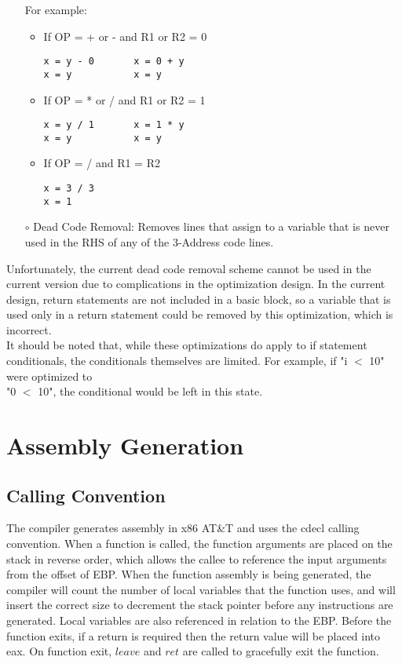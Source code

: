 \documentclass{scrartcl}
\begin{document}
\begin{itemize}
For example:
\begin{itemize}
\item If OP = + or - and R1 or R2 = 0
\begin{verbatim}
x = y - 0       x = 0 + y
x = y           x = y
\end{verbatim}
\item If OP = * or / and R1 or R2 = 1
\begin{verbatim}
x = y / 1       x = 1 * y
x = y           x = y
\end{verbatim}
\item If OP = / and R1 = R2
\begin{verbatim}
x = 3 / 3
x = 1
\end{verbatim}
\end{itemize}
\item[$\circ$] Dead Code Removal: Removes lines that assign to a variable that is never used in the RHS of any of the 3-Address code lines.
\end{itemize}

Unfortunately, the current dead code removal scheme cannot be used in the current version due to complications in the optimization design.
In the current design, return statements are not included in a basic block, so a variable that is used only in a return statement could be
removed by this optimization, which is incorrect. \\

It should be noted that, while these optimizations do apply to if statement conditionals, the conditionals themselves are limited.
For example, if "i $<$ 10" were optimized to \\
"0 $<$ 10", the conditional would be left in this state.

\section{Assembly Generation}
\subsection{Calling Convention}
The compiler generates assembly in x86 AT\&T and uses the cdecl calling convention. When a function is called, the function arguments are placed on the stack in reverse order, which allows the callee to reference the input arguments from the offset of EBP. When the function assembly is being generated, the compiler will count the number of local variables that the function uses, and will insert the correct size to decrement the stack pointer before any instructions are generated. Local variables are also referenced in relation to the EBP. Before the function exits, if a return is required then the return value will be placed into eax. On function exit, $leave$ and $ret$ are called to gracefully exit the function.
\end{document}
